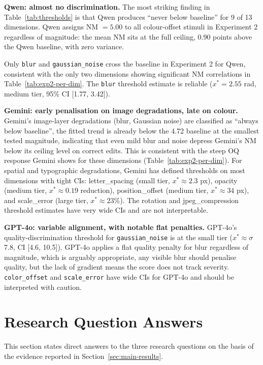 \textbf{Qwen: almost no discrimination.} The most striking finding in Table~\ref{tab:thresholds} is that Qwen produces ``never below baseline'' for 9 of 13 dimensions. Qwen assigns NM $= 5.00$ to all colour-offset stimuli in Experiment 2 regardless of magnitude: the mean NM sits at the full ceiling, 0.90 points above the Qwen baseline, with zero variance.

Only \texttt{blur} and \texttt{gaussian\_noise} cross the baseline in Experiment 2 for Qwen, consistent with the only two dimensions showing significant NM correlations in Table~\ref{tab:exp2-per-dim}. The \texttt{blur} threshold estimate is reliable ($x^* = 2.55$ rad, medium tier, 95\% CI [1.77, 3.42]).

\textbf{Gemini: early penalisation on image degradations, late on colour.} Gemini's image-layer degradations (blur, Gaussian noise) are classified as ``always below baseline'', the fitted trend is already below the 4.72 baseline at the smallest tested magnitude, indicating that even mild blur and noise depress Gemini's NM below its ceiling level on correct edits. This is consistent with the steep OQ response Gemini shows for these dimensions (Table~\ref{tab:exp2-per-dim}). For spatial and typographic degradations, Gemini has defined thresholds on most dimensions with tight CIs: letter\_spacing (small tier, $x^* \approx 2.3$ px), opacity (medium tier, $x^* \approx 0.19$ reduction), position\_offset (medium tier, $x^* \approx 34$ px), and scale\_error (large tier, $x^* \approx 23\%$). The rotation and jpeg\_compression threshold estimates have very wide CIs and are not interpretable.

\textbf{GPT-4o: variable alignment, with notable flat penalties.} GPT-4o's quality-discrimination threshold for \texttt{gaussian\_noise} is at the small tier ($x^* \approx \sigma$ 7.8, CI [4.6, 10.5]). GPT-4o applies a flat quality penalty for blur regardless of magnitude, which is arguably appropriate, any visible blur should penalise quality, but the lack of gradient means the score does not track severity. \texttt{color\_offset} and \texttt{scale\_error} have wide CIs for GPT-4o and should be interpreted with caution.


\section{Research Question Answers} \label{sec:rq-answers}

This section states direct answers to the three research questions on the basis of the evidence reported in Section~\ref{sec:main-results}.

